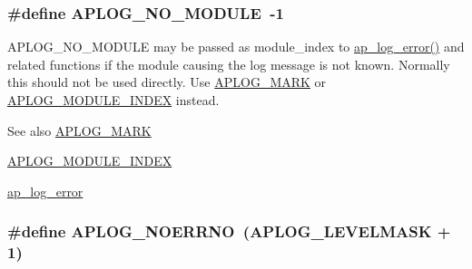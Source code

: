\subsubsection[{\texorpdfstring{A\+P\+L\+O\+G\+\_\+\+N\+O\+\_\+\+M\+O\+D\+U\+LE}{APLOG_NO_MODULE}}]{\setlength{\rightskip}{0pt plus 5cm}\#define A\+P\+L\+O\+G\+\_\+\+N\+O\+\_\+\+M\+O\+D\+U\+LE~-\/1}\hypertarget{group__APACHE__CORE__LOG_gad04ae11f8e466af433e82e961d12a6bf}{}\label{group__APACHE__CORE__LOG_gad04ae11f8e466af433e82e961d12a6bf}
A\+P\+L\+O\+G\+\_\+\+N\+O\+\_\+\+M\+O\+D\+U\+LE may be passed as module\+\_\+index to \hyperlink{group__APACHE__CORE__LOG_ga5e6676c87418af7a1d323a116c78ecb4}{ap\+\_\+log\+\_\+error()} and related functions if the module causing the log message is not known. Normally this should not be used directly. Use \hyperlink{group__APACHE__CORE__LOG_ga655e126996849bcb82e4e5a14c616f4a}{A\+P\+L\+O\+G\+\_\+\+M\+A\+RK} or \hyperlink{group__APACHE__CORE__LOG_gae75325996d1b2cf6120dded4cb153a22}{A\+P\+L\+O\+G\+\_\+\+M\+O\+D\+U\+L\+E\+\_\+\+I\+N\+D\+EX} instead.

\begin{DoxySeeAlso}{See also}
\hyperlink{group__APACHE__CORE__LOG_ga655e126996849bcb82e4e5a14c616f4a}{A\+P\+L\+O\+G\+\_\+\+M\+A\+RK} 

\hyperlink{group__APACHE__CORE__LOG_gae75325996d1b2cf6120dded4cb153a22}{A\+P\+L\+O\+G\+\_\+\+M\+O\+D\+U\+L\+E\+\_\+\+I\+N\+D\+EX} 

\hyperlink{group__APACHE__CORE__LOG_ga5e6676c87418af7a1d323a116c78ecb4}{ap\+\_\+log\+\_\+error} 
\end{DoxySeeAlso}
\subsubsection[{\texorpdfstring{A\+P\+L\+O\+G\+\_\+\+N\+O\+E\+R\+R\+NO}{APLOG_NOERRNO}}]{\setlength{\rightskip}{0pt plus 5cm}\#define A\+P\+L\+O\+G\+\_\+\+N\+O\+E\+R\+R\+NO~({\bf A\+P\+L\+O\+G\+\_\+\+L\+E\+V\+E\+L\+M\+A\+SK} + 1)}\hypertarget{group__APACHE__CORE__LOG_ga24e0d748a992633c7fb9e1ac51a4d47f}{}\label{group__APACHE__CORE__LOG_ga24e0d748a992633c7fb9e1ac51a4d47f}
